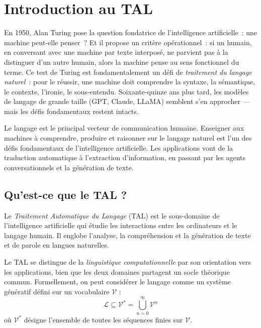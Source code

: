 \chapter{Introduction au TAL}
\label{ch:introduction}

En 1950, Alan Turing pose la question fondatrice de l'intelligence
artificielle~: une machine peut-elle \og penser\fg{}~? Et il propose un
crit\`ere op\'erationnel~: si un humain, en conversant avec une machine par
texte interpos\'e, ne parvient pas \`a la distinguer d'un autre humain, alors
la machine \og pense\fg{} au sens fonctionnel du terme. Ce \og test de
Turing\fg{} est fondamentalement un d\'efi de \emph{traitement du langage
naturel}~: pour le r\'eussir, une machine doit comprendre la syntaxe, la
s\'emantique, le contexte, l'ironie, le sous-entendu. Soixante-quinze ans
plus tard, les mod\`eles de langage de grande taille (GPT, Claude, LLaMA)
semblent s'en approcher --- mais les d\'efis fondamentaux restent
intacts.

\begin{intuition}[title=\textbf{Pourquoi \'etudier le TAL ?}]
Le langage est le principal vecteur de communication humaine. Enseigner aux
machines \`a comprendre, produire et raisonner sur le langage naturel est l'un
des d\'efis fondamentaux de l'intelligence artificielle. Les applications vont
de la traduction automatique \`a l'extraction d'information, en passant par les
agents conversationnels et la g\'en\'eration de texte.
\end{intuition}

\section{Qu'est-ce que le TAL ?}
\label{sec:intro:quoi}

\begin{definition}
Le \emph{Traitement Automatique du Langage} (TAL) est le sous-domaine de
l'intelligence artificielle qui \'etudie les interactions entre les ordinateurs
et le langage humain. Il englobe l'analyse, la compr\'ehension et la g\'en\'eration
de texte et de parole en langues naturelles.
\end{definition}

Le TAL se distingue de la \emph{linguistique computationnelle} par son
orientation vers les applications, bien que les deux domaines partagent un
socle th\'eorique commun. Formellement, on peut consid\'erer le langage comme
un syst\`eme g\'en\'eratif d\'efini sur un vocabulaire $\mathcal{V}$ :
\[
\mathcal{L} \subseteq \mathcal{V}^* = \bigcup_{n=0}^{\infty} \mathcal{V}^n
\]
o\`u $\mathcal{V}^*$ d\'esigne l'ensemble de toutes les s\'equences finies
sur $\mathcal{V}$.

